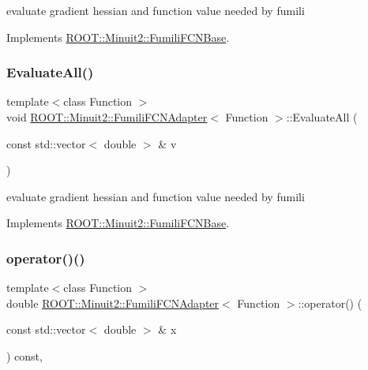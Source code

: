 evaluate gradient hessian and function value needed by fumili 

Implements \mbox{\hyperlink{classROOT_1_1Minuit2_1_1FumiliFCNBase_a0741bb4a7405cc33ab60583472a189cb}{R\+O\+O\+T\+::\+Minuit2\+::\+Fumili\+F\+C\+N\+Base}}.

\mbox{\label{classROOT_1_1Minuit2_1_1FumiliFCNAdapter_a75bacae09c510900a45ea753afae971a}} 
\subsubsection{\texorpdfstring{EvaluateAll()}{EvaluateAll()}\hspace{0.1cm}{\footnotesize\ttfamily [3/3]}}
{\footnotesize\ttfamily template$<$class Function $>$ \\
void \mbox{\hyperlink{classROOT_1_1Minuit2_1_1FumiliFCNAdapter}{R\+O\+O\+T\+::\+Minuit2\+::\+Fumili\+F\+C\+N\+Adapter}}$<$ Function $>$\+::Evaluate\+All (\begin{DoxyParamCaption}\item[{const std\+::vector$<$ double $>$ \&}]{v }\end{DoxyParamCaption})\hspace{0.3cm}{\ttfamily [virtual]}}

evaluate gradient hessian and function value needed by fumili 

Implements \mbox{\hyperlink{classROOT_1_1Minuit2_1_1FumiliFCNBase_a0741bb4a7405cc33ab60583472a189cb}{R\+O\+O\+T\+::\+Minuit2\+::\+Fumili\+F\+C\+N\+Base}}.

\mbox{\label{classROOT_1_1Minuit2_1_1FumiliFCNAdapter_a7381e9f93fbec9e0504e3e340c281056}} 
\subsubsection{\texorpdfstring{operator()()}{operator()()}\hspace{0.1cm}{\footnotesize\ttfamily [1/6]}}
{\footnotesize\ttfamily template$<$class Function $>$ \\
double \mbox{\hyperlink{classROOT_1_1Minuit2_1_1FumiliFCNAdapter}{R\+O\+O\+T\+::\+Minuit2\+::\+Fumili\+F\+C\+N\+Adapter}}$<$ Function $>$\+::operator() (\begin{DoxyParamCaption}\item[{const std\+::vector$<$ double $>$ \&}]{x }\end{DoxyParamCaption}) const\hspace{0.3cm}{\ttfamily [inline]}, {\ttfamily [virtual]}}

